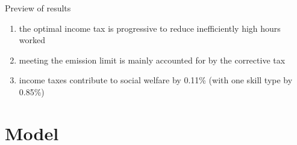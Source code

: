 \documentclass[11pt,aspectratio=169]{beamer}
\begin{document}
\begin{frame}{Preview of results}
	\pause
\begin{enumerate}
	\item<+-> the \alert{optimal income tax is progressive}  to reduce inefficiently high hours worked
	\vspace{5mm}
	\item<+->  meeting the emission limit is mainly accounted for by the corrective tax
	\vspace{5mm}
	\item<+-> income taxes contribute to social welfare by 0.11\%  \small{(with one skill type by 0.85\%)}  %
	
	\vspace{5mm}
\end{enumerate}
\end{frame}

\section{Model}

\end{document}
